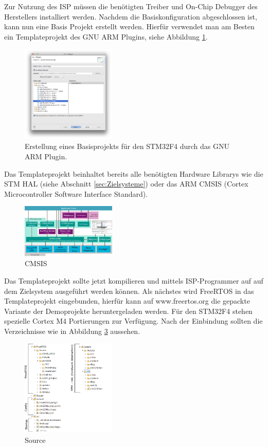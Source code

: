 Zur Nutzung des ISP müssen die benötigten Treiber und On-Chip Debugger des Herstellers installiert werden.            
Nachdem die Basiskonfiguration abgeschlossen ist, kann nun eine Basis Projekt erstellt werden. Hierfür verwendet man am Besten ein Templateprojekt des GNU ARM Plugins, siehe Abbildung \ref{fig:NewProj}.
\begin{figure}[htb]
	\centering
		\includegraphics[width=0.4\textwidth]{Pictures/Einrichtung/NewF4Project.png}
	\caption{Erstellung eines Basisprojekts für den STM32F4 durch das GNU ARM Plugin.}
	\label{fig:NewProj}
\end{figure}
Das Templateprojekt beinhaltet bereits alle benötigten Hardware Librarys wie die STM HAL (siehe Abschnitt \ref{sec:Zielsysteme}) oder das ARM CMSIS (Cortex Microcontroller Software Interface Standard).
\begin{figure}[htb]
	\centering
		\includegraphics[width=0.4\textwidth]{Pictures/Einrichtung/CMSISv4_small.jpg}
	\caption{CMSIS}
	\label{fig:CMSIS}
\end{figure}
Das Templateprojekt sollte jetzt kompilieren und mittels ISP-Programmer auf auf dem Zielsystem ausgeführt werden können.
Als nächstes wird FreeRTOS in das Templateprojekt eingebunden, hierfür kann auf www.freertos.org die gepackte Variante der Demoprojekte heruntergeladen werden. Für den STM32F4 stehen spezielle Cortex M4 Portierungen zur Verfügung. Nach der Einbindung sollten die Verzeichnisse wie in Abbildung \ref{fig:SourceTree} aussehen.
\begin{figure}[htb]
	\centering
		\includegraphics[width=0.4\textwidth]{Pictures/Einrichtung/sourceTree.png}
	\caption{Source}
	\label{fig:SourceTree}
\end{figure}

